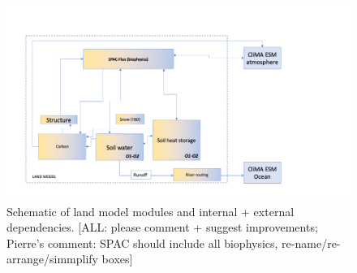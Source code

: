 \documentclass{article}
\begin{document}
\begin{figure}[htb]
\includegraphics{CLIMA-land/LM_figures/CliMA_LM_modules.png}
\caption{Schematic of land model modules and internal + external dependencies. [ALL: please comment + suggest improvements; Pierre's comment: SPAC should include all biophysics, re-name/re-arrange/simmplify boxes]}
\end{figure}
\end{document}
